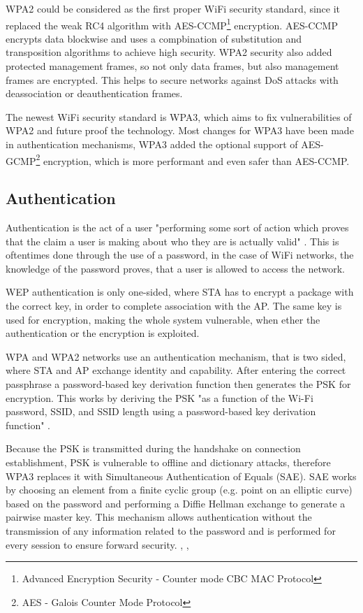 WPA2 could be considered as the first proper WiFi security standard, since it replaced the weak RC4 algorithm with AES-CCMP\footnote{Advanced Encryption Security - Counter mode CBC MAC Protocol} encryption.
AES-CCMP encrypts data blockwise and uses a compbination of substitution and transposition algorithms to achieve high security.
WPA2 security also added protected management frames, so not only data frames, but also management frames are encrypted.
This helps to secure networks against DoS attacks with deassociation or deauthentication frames.

The newest WiFi security standard is WPA3, which aims to fix vulnerabilities of WPA2 and future proof the technology.
Most changes for WPA3 have been made in authentication mechanisms, WPA3 added the optional support of AES-GCMP\footnote{AES - Galois Counter Mode Protocol} encryption, which is more performant and even safer than AES-CCMP. \cite[page~103-117]{Sankaran_Gulasekaran_2021}


\subsection{Authentication}

Authentication is the act of a user "performing some sort of action which proves that the claim a user is making about who they are is actually valid" \cite{Oriyano_2017}. 
This is oftentimes done through the use of a password, in the case of WiFi networks, the knowledge of the password proves, that a user is allowed to access the network.

WEP authentication is only one-sided, where STA has to encrypt a package with the correct key, in order to complete association with the AP. 
The same key is used for encryption, making the whole system vulnerable, when ether the authentication or the encryption is exploited. 

WPA and WPA2 networks use an authentication mechanism, that is two sided, where STA and AP exchange identity and capability.
After entering the correct passphrase a password-based key derivation function then generates the PSK for encryption. 
This works by deriving the PSK "as a function of the Wi-Fi password, SSID, and SSID length using a password-based key derivation function" \cite[page~106]{Sankaran_Gulasekaran_2021}.

Because the PSK is transmitted during the handshake on connection establishment, PSK is vulnerable to offline and dictionary attacks, therefore WPA3 replaces it with Simultaneous Authentication of Equals (SAE).
SAE works by choosing an element from a finite cyclic group (e.g. point on an elliptic curve) based on the password and performing a Diffie Hellman exchange to generate a pairwise master key.
This mechanism allows authentication without the transmission of any information related to the password and is performed for every session to ensure forward security.
\cite{Oriyano_2017}, \cite[page~115-116]{Sankaran_Gulasekaran_2021}, \cite{SAE}


